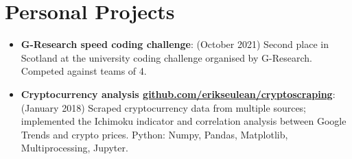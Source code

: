 \documentclass[letterpaper,11pt]{article}
\newcommand{\resumeItem}[2]{
  \item\small{
    \textbf{#1}{: #2 \vspace{-1pt}}
  }
}
\newcommand{\resumeSubItem}[2]{\resumeItem{#1}{#2}\vspace{-5pt}}
\newcommand{\resumeSubHeadingListStart}{\begin{itemize}[leftmargin=*]}
\newcommand{\resumeSubHeadingListEnd}{\end{itemize}}
\begin{document}
\section{Personal Projects}
  \resumeSubHeadingListStart
    \resumeSubItem {G-Research speed coding challenge}
    {(October 2021) Second place in Scotland at the university coding challenge organised by G-Research. Competed against teams of 4.}
    \resumeSubItem {Cryptocurrency analysis \href{https://github.com/erikseulean/cryptoscraping}{github.com/erikseulean/cryptoscraping}}
    {(January 2018) Scraped cryptocurrency data from multiple sources; implemented the Ichimoku indicator and correlation analysis between Google Trends and crypto prices. Python: Numpy, Pandas, Matplotlib, Multiprocessing, Jupyter.}
  \resumeSubHeadingListEnd
\end{document}
